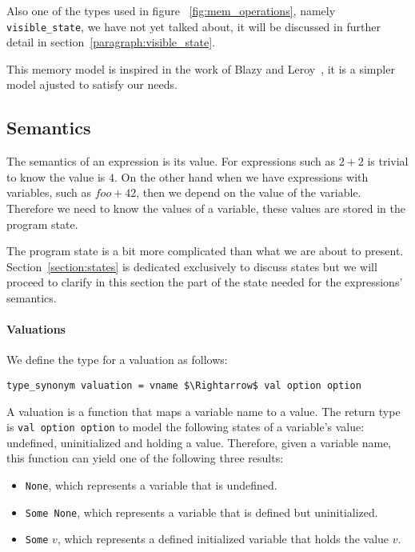 Also one of the types used in figure ~\ref{fig:mem_operations}, namely \verb|visible_state|, we have not yet talked about, it will be discussed in further detail in section~\ref{paragraph:visible_state}.

This memory model is inspired in the work of Blazy and Leroy~\parencite{compcert}, it is a simpler model ajusted to satisfy our needs.


\subsection{Semantics}\label{subsection:semantics_expressions}

The semantics of an expression is its value.
For expressions such as $2 + 2$ is trivial to know the value is $4$.
On the other hand when we have expressions with variables, such as $foo + 42$, then we depend on the value of the variable.
Therefore we need to know the values of a variable, these values are stored in the program state.

The program state is a bit more complicated than what we are about to present.
Section~\ref{section:states} is dedicated exclusively to discuss states but we will proceed to clarify in this section the part of the state needed for the expressions' semantics.

\paragraph{Valuations}\label{paragraph:valuation}

We define the type for a valuation as follows:

\begin{lstlisting}[frame=single, mathescape=true]
type_synonym valuation = vname $\Rightarrow$ val option option
\end{lstlisting}

A valuation is a function that maps a variable name to a value.
The return type is \verb|val option option| to model the following states of a variable's value: undefined, uninitialized and holding a value.
Therefore, given a variable name, this function can yield one of the following three results:

\begin{itemize}
  \item{\verb|None|, which represents a variable that is undefined.}
  \item{\verb|Some None|, which represents a variable that is defined but uninitialized.}
  \item{\verb|Some| $v$, which represents a defined initialized variable that holds the value $v$.}
\end{itemize}

